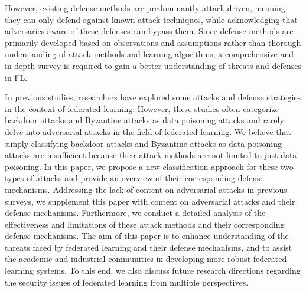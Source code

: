 \documentclass[conference]{IEEEtran}
\begin{document}
However, existing defense methods are predominantly attack-driven, 
meaning they can only defend against known attack techniques, 
while acknowledging that adversaries aware of these defenses can bypass them. 
Since defense methods are primarily developed based on observations 
and assumptions rather than thorough understanding of attack methods 
and learning algorithms, 
a comprehensive and in-depth survey is required to gain a better understanding of 
threats and defenses in FL.

In previous studies\cite{b11,b12,b13,b14,b15}, 
researchers have explored some attacks and defense strategies in the context 
of federated learning. 
However, these studies often categorize backdoor attacks 
and Byzantine attacks as data poisoning attacks and 
rarely delve into adversarial attacks in the field of federated learning. 
We believe that simply classifying backdoor attacks and Byzantine attacks 
as data poisoning attacks are insufficient 
because their attack methods are not limited to just data poisoning.
In this paper, we propose a new classification approach for these two 
types of attacks and provide an overview of their corresponding defense mechanisms. 
Addressing the lack of content on adversarial attacks in previous surveys, 
we supplement this paper with content on adversarial attacks and their defense 
mechanisms. 
Furthermore, we conduct a detailed analysis of the effectiveness and limitations 
of these attack methods and their corresponding defense mechanisms. 
The aim of this paper is to enhance understanding of the threats faced 
by federated learning and their defense mechanisms, 
and to assist the academic and industrial communities in 
developing more robust federated learning systems. 
To this end, we also discuss future research directions 
regarding the security issues of federated learning from multiple perspectives.
\end{document}
